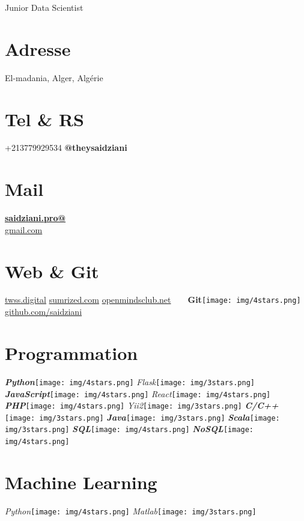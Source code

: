 \documentclass[]{friggeri-cv}
\begin{document}
      {Junior Data Scientist}
      

\begin{aside}
  \section{Adresse}
    El-madania, Alger, Algérie
    ~
    ~
  \section{Tel \& RS}
    +213779929534
    {\textbf{@theysaidziani}}
    ~
    ~
  \section{Mail}
    \href{mailto:saidziani.pro@gmail.com}{\textbf{saidziani.pro@}\\gmail.com}
    ~
    ~
  \section{Web \& Git}
    \href{http://www.twss.digital}{twss.digital}
    \href{http://www.sumrized.com}{sumrized.com}
    \href{http://www.openmindsclub.net}{openmindsclub.net}
    ~
    ~
    \textbf{Git}\texttt{[image: img/4stars.png]}
    \href{https://github.com/saidziani}{github.com/saidziani}
    ~
    ~
  \section{Programmation}
    \emph{\textbf{Python}}\texttt{[image: img/4stars.png]}
    \emph{Flask}\texttt{[image: img/3stars.png]}
    \emph{\textbf{JavaScript}}\texttt{[image: img/4stars.png]}
    \emph{React}\texttt{[image: img/4stars.png]}
    \emph{\textbf{PHP}}\texttt{[image: img/4stars.png]}
    \emph{Yii2}\texttt{[image: img/3stars.png]}
    \emph{\textbf{C/C++}}\texttt{[image: img/3stars.png]}
    \emph{\textbf{Java}}\texttt{[image: img/3stars.png]}
    \emph{\textbf{Scala}}\texttt{[image: img/3stars.png]}
    \emph{\textbf{SQL}}\texttt{[image: img/4stars.png]}
    \emph{\textbf{NoSQL}}\texttt{[image: img/4stars.png]}
    ~
    ~
  \section{Machine Learning}
    \emph{Python}\texttt{[image: img/4stars.png]}
    \emph{Matlab}\texttt{[image: img/3stars.png]}
    ~

\end{aside}
\end{document}
